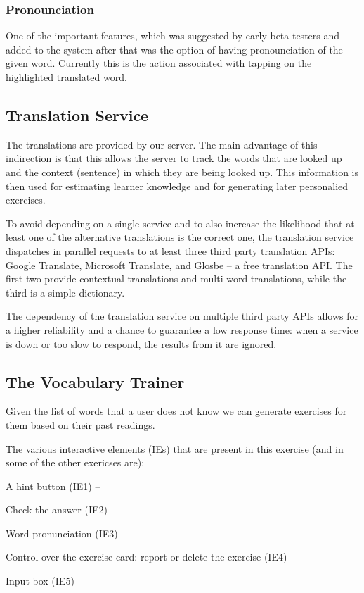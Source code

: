 \subsubsection{Pronounciation}
One of the important features, which was suggested by early beta-testers and added to the system after that was the option of having pronounciation of the given word. Currently this is the action associated with tapping on the highlighted translated word.


\subsection {Translation Service}

The translations are provided by our server. The main advantage of this indirection is that this allows the server to track the words that are looked up and the context (sentence) in which they are being looked up. This information is then used for estimating learner knowledge and for generating later personalied exercises. 

To avoid depending on a single service and to also increase the likelihood that at least one of the alternative translations is the correct one, the translation service dispatches in parallel requests to at least three third party translation APIs: Google Translate, Microsoft Translate, and Glosbe -- a free translation API. The first two provide contextual translations and multi-word translations, while the third is a simple dictionary. 

The dependency of the translation service on multiple third party APIs allows for a higher reliability and a chance to guarantee a low response time: when a service is down or too slow to respond, the results from it are ignored.

\subsection{The Vocabulary Trainer}

Given the list of words that a user does not know we can generate exercises for them based on their past readings.

The various interactive elements (IEs) that are present in this exercise (and in some of the other exericses are): 

\begin{description}
	\item A hint button (IE1) --
	\item Check the answer (IE2) -- 
	\item Word pronunciation (IE3) -- 
	\item Control over the exercise card: report or delete the exercise (IE4) -- 
	\item Input box (IE5) -- 
\end{description}

